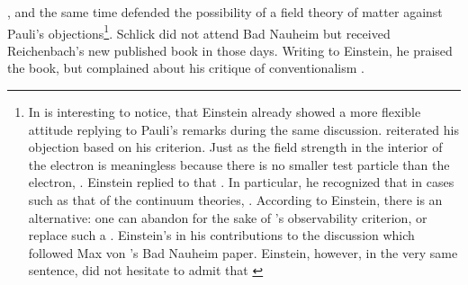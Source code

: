 \documentclass[draft]{article}
\renewcommand{\me}{;~m.e.{}}
\begin{document}
{}, and the same time defended the possibility of a field theory of matter against Pauli's objections\footnote{In is interesting to notice, that Einstein already showed a more flexible attitude replying to Pauli's remarks during the same discussion. \Pauli reiterated his objection based on his  criterion. Just as the field strength in the interior of the electron is meaningless because there is no smaller test particle than the electron,  \citep[650]{Einstein1920c}. Einstein replied to \Pauli that  \citep[650]{Einstein1920c}. In particular, he recognized that in cases such as that of the continuum theories,  \citep[650]{Einstein1920c}. According to Einstein, there is an alternative: one can abandon  for the sake of \Pauli's observability criterion, or replace such a  \citep[650]{Einstein1920c}.  Einstein's in his contributions to the discussion which followed Max von 's Bad Nauheim paper. Einstein, however, in the very same sentence, did not hesitate to admit that  \citep[Einstein's reply to][662\me]{Laue1920}}.  Schlick did not attend Bad Nauheim but received Reichenbach's new published book in those days. Writing to Einstein, he praised the book, but complained about his critique of conventionalism . 
\end{document}
